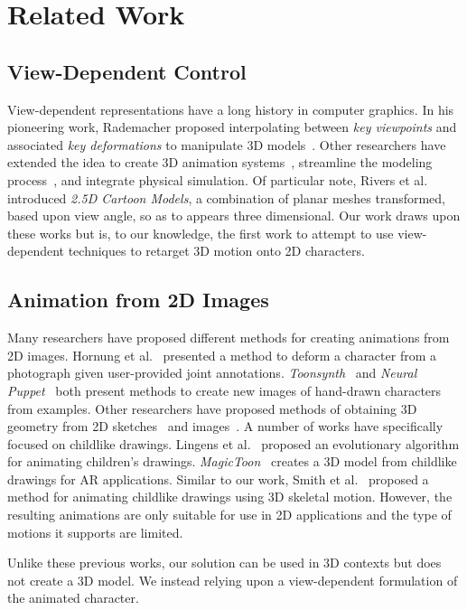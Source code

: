 \section{Related Work}

\subsection{View-Dependent Control}
View-dependent representations have a long history in computer graphics.
In his pioneering work, Rademacher proposed interpolating between \textit{key viewpoints} and associated \textit{key deformations} to manipulate 3D models~\cite{rademacher1999view}.
Other researchers have extended the idea to create 3D animation systems~\cite{10.1111:j.1467-8659.2004.00772.x}, streamline the modeling process~\cite{DBLP:journals/corr/abs-2103-15472}, and integrate physical simulation\cite{koyama2013view}.
Of particular note, Rivers et al.~\cite{rivers25Dcartoonmodels} introduced \textit{2.5D Cartoon Models}, a combination of planar meshes transformed, based upon view angle, so as to appears three dimensional.
Our work draws upon these works but is, to our knowledge, the first work to attempt to use view-dependent techniques to retarget 3D motion onto 2D characters.   

\subsection{Animation from 2D Images}

Many researchers have proposed different methods for creating animations from 2D images. Hornung et al.~\cite{Hornung2007anim2Dpicmotion} presented a method to deform a character from a photograph given user-provided joint annotations.
\textit{Toonsynth}~\cite{Dvoroznak18-SIG} and \textit{Neural Puppet}~\cite{poursaeed2020neural} both present methods to create new images of hand-drawn characters from examples.
Other researchers have proposed methods of obtaining 3D geometry from 2D sketches~\cite{igarashi2006teddy, Dvoroznak20-SA} and images~\cite{ArtiSketch,weng2019photo}.
A number of works have specifically focused on childlike drawings.
Lingens et al.~\cite{lingens2020towards} proposed an evolutionary algorithm for animating children's drawings. 
\textit{MagicToon}~\cite{feng2017magictoon} creates a 3D model from childlike drawings for AR applications.
Similar to our work, Smith et al.~\cite{SmithHodgins} proposed a method for animating childlike drawings using 3D skeletal motion. 
However, the resulting animations are only suitable for use in 2D applications and the type of motions it supports are limited.

Unlike these previous works, our solution can be used in 3D contexts but does not create a 3D model. We instead relying upon a view-dependent formulation of the animated character.
